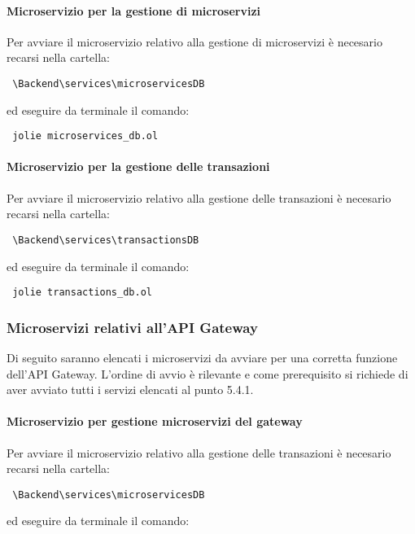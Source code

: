 	\paragraph{Microservizio per la gestione di microservizi}
	Per avviare il microservizio relativo alla gestione di microservizi è necesario recarsi nella cartella:
	\begin{center}
		\verb| \Backend\services\microservicesDB|
	\end{center}
	
	ed eseguire da terminale il comando:
	
	\begin{center}
		\verb| jolie microservices_db.ol |
	\end{center}

	\paragraph{Microservizio per la gestione delle transazioni}
Per avviare il microservizio relativo alla gestione delle transazioni è necesario recarsi nella cartella:
\begin{center}
	\verb| \Backend\services\transactionsDB|
\end{center}

ed eseguire da terminale il comando:

\begin{center}
	\verb| jolie transactions_db.ol |
\end{center}

\subsubsection{Microservizi relativi all'API Gateway}
Di seguito saranno elencati i microservizi da avviare per una corretta funzione dell'API Gateway. L'ordine di avvio  è rilevante e come prerequisito si richiede di aver avviato tutti i servizi elencati al punto 5.4.1.

\paragraph{Microservizio per gestione microservizi del gateway}
	Per avviare il microservizio relativo alla gestione delle transazioni è necesario recarsi nella cartella:
	\begin{center}
		\verb| \Backend\services\microservicesDB|
	\end{center}
	
	ed eseguire da terminale il comando:
	
